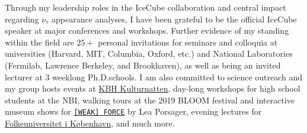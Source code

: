 \documentclass[a4paper,11pt]{article}
\begin{document}

\newpage


Through my leadership roles in the IceCube collaboration and central impact regarding $\nu_\tau$ appearance analyses, I have been grateful to be the official IceCube speaker at major conferences and workshops. Further evidence of my standing within the field are $25+$ personal invitations for seminars and colloquia at universities (Harvard, MIT, Columbia, Oxford, etc.) and National Laboratories (Fermilab, Lawrence Berkeley, and Brookhaven), as well as being an invited lecturer at $3$ weeklong Ph.D.\@ schools. I am also committed to science outreach and my group hosts events at \href{https://www.kulturnatten.dk/da/Kulturnatten}{KBH Kulturnatten}, day-long workshops for high school students at the NBI, walking tours at the 2019 BLOOM festival and interactive museum shows for \href{https://samtidskunst.dk/sites/default/files/press/pressemeddelelse_uk_weak_force.pdf}{\texttt{[WEAK] FORCE}} by Lea Porsager, evening lectures for \href{https://nbia.nbi.ku.dk/calendar/past/public/}{Folkeuniversitet i K{\o}benhavn}, and much more.
\end{document}
